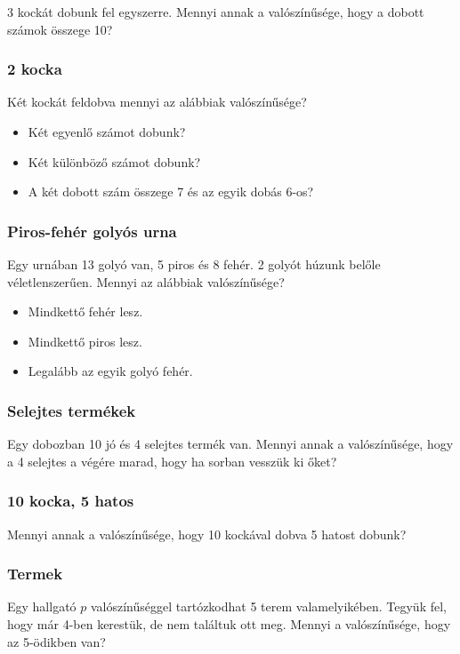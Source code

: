 \documentclass[a4paper]{article}
\begin{document}
3 kockát dobunk fel egyszerre. Mennyi annak a valószínűsége, hogy a dobott számok összege 10?

\subsubsection{2 kocka}

Két kockát feldobva mennyi az alábbiak valószínűsége?
\begin{itemize}
\item Két egyenlő számot dobunk?
\item Két különböző számot dobunk?
\item A két dobott szám összege 7 és az egyik dobás 6-os?
\end{itemize}

\subsubsection{Piros-fehér golyós urna}

Egy urnában 13 golyó van, 5 piros és 8 fehér.
2 golyót húzunk belőle véletlenszerűen.
Mennyi az alábbiak valószínűsége?
\begin{itemize}
\item Mindkettő fehér lesz.
\item Mindkettő piros lesz.
\item Legalább az egyik golyó fehér.
\end{itemize}

\subsubsection{Selejtes termékek}

Egy dobozban 10 jó és 4 selejtes termék van.
Mennyi annak a valószínűsége, hogy a 4 selejtes a végére marad, hogy ha sorban vesszük ki őket?

\subsubsection{10 kocka, 5 hatos}

Mennyi annak a valószínűsége, hogy 10 kockával dobva 5 hatost dobunk?

\subsubsection{Termek}

Egy hallgató $p$ valószínűséggel tartózkodhat 5 terem valamelyikében.
Tegyük fel, hogy már 4-ben kerestük, de nem találtuk ott meg.
Mennyi a valószínűsége, hogy az 5-ödikben van?
\end{document}

